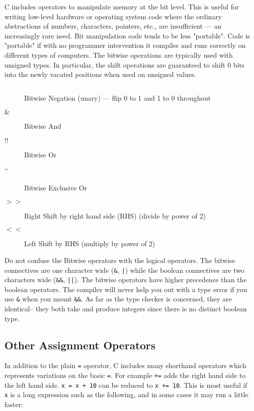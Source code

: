 C includes operators to manipulate memory at the bit level. This is useful for writing low-level hardware or operating system code where the ordinary abstractions of numbers, characters, pointers, etc., are insufficient --- an increasingly rare need. Bit manipulation code tends to be less "portable". Code is "portable" if with no programmer intervention it compiles and runs correctly on different types of computers. The bitwise operations are typically used with unsigned types. In particular, the shift operations are guaranteed to shift 0 bits into the newly vacated positions when used on unsigned values.

\begin{description}
\item[$~$] Bitwise Negation (unary) --– flip 0 to 1 and 1 to 0 throughout
\item[$\&$] Bitwise And
\item[$!!$] Bitwise Or
\item[\^] Bitwise Exclusive Or
\item[$>>$] Right Shift by right hand side (RHS) (divide by power of 2)
\item[$<<$] Left Shift by RHS (multiply by power of 2)
\end{description}

Do not confuse the Bitwise operators with the logical operators. The bitwise connectives are one character wide (\lstinline{&}, \lstinline{|}) while the boolean connectives are two characters wide (\lstinline{&&}, \lstinline{||}). The bitwise operators have higher precedence than the boolean operators. The compiler will never help you out with a type error if you use \lstinline{&} when you meant \lstinline{&&}. As far as the type checker is concerned, they are identical-- they both take and produce integers since there is no distinct boolean type.

\subsection{Other Assignment Operators}

In addition to the plain \lstinline{=} operator, C includes many shorthand operators which represents variations on the basic \lstinline{=}. For example \lstinline{+=} adds the right hand side to the left hand side. \lstinline{x = x + 10} can be reduced to \lstinline{x += 10}. This is most useful if \lstinline{x} is a long expression such as the following, and in some cases it may run a little faster:

